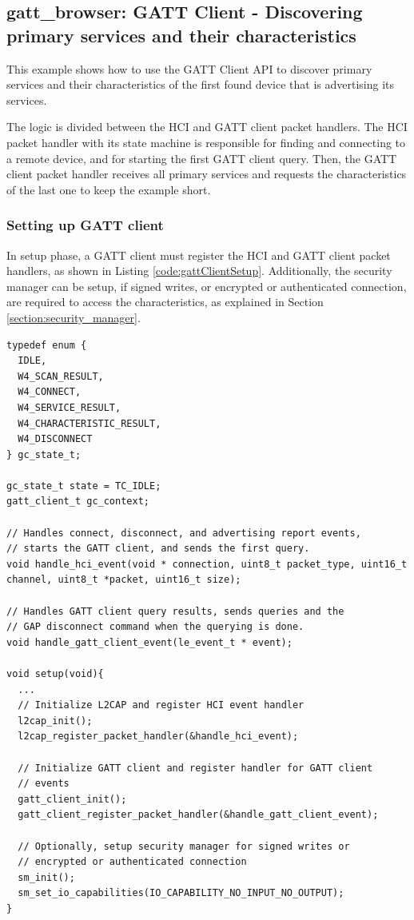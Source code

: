 \documentclass[a4paper,titlepage,oneside,12pt]{amsart} %
\begin{document}
\subsection {gatt\_browser: GATT Client - Discovering primary services and their characteristics}
\label{example:gatt_browser}
This example shows how to use the GATT Client API to discover primary services and their characteristics of the first found device that is advertising its services.

The logic is divided between the HCI and GATT client packet handlers. The HCI packet handler with its state machine is responsible for finding and connecting to a remote device, and for starting the first GATT client query. Then, the GATT client packet handler receives all primary services and requests the characteristics of the last one to keep the example short.

\subsubsection{Setting up GATT client}
In setup phase, a GATT client must register the HCI and GATT client packet handlers, as shown in Listing \ref{code:gattClientSetup}. Additionally, the security manager can be setup, if signed writes, or encrypted or authenticated connection, are required to access the characteristics, as explained in Section \ref{section:security_manager}.  

\begin{lstlisting}[caption= Setting up GATT client., label=code:gattClientSetup]
typedef enum {
  IDLE,
  W4_SCAN_RESULT,
  W4_CONNECT,
  W4_SERVICE_RESULT,
  W4_CHARACTERISTIC_RESULT,
  W4_DISCONNECT
} gc_state_t;

gc_state_t state = TC_IDLE;
gatt_client_t gc_context;

// Handles connect, disconnect, and advertising report events,  
// starts the GATT client, and sends the first query.
void handle_hci_event(void * connection, uint8_t packet_type, uint16_t channel, uint8_t *packet, uint16_t size);

// Handles GATT client query results, sends queries and the 
// GAP disconnect command when the querying is done.
void handle_gatt_client_event(le_event_t * event);

void setup(void){
  ...
  // Initialize L2CAP and register HCI event handler
  l2cap_init();
  l2cap_register_packet_handler(&handle_hci_event);

  // Initialize GATT client and register handler for GATT client
  // events
  gatt_client_init();
  gatt_client_register_packet_handler(&handle_gatt_client_event);
  
  // Optionally, setup security manager for signed writes or 
  // encrypted or authenticated connection
  sm_init();
  sm_set_io_capabilities(IO_CAPABILITY_NO_INPUT_NO_OUTPUT);
}
\end{lstlisting}
\end{document}
